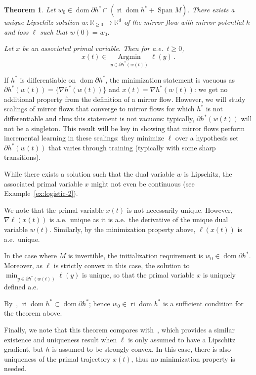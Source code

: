 \documentclass[11pt,english,reqno]{article}
\DeclareMathOperator{\Span}{Span}
\DeclareMathOperator{\dom}{dom}
\DeclareMathOperator{\Argmin}{Argmin}
\DeclareMathOperator{\ri}{ri}
\newcommand{\R}{\mathbb{R}}
\renewcommand{\geq}{\geqslant}
\theoremstyle{plain}
\newtheorem{thm}[proposition]{Theorem}
\theoremstyle{definition}
\theoremstyle{remark}
\numberwithin{equation}{section}
\begin{document}
\begin{thm}
	\label{thm:existence-mirror-flow}
	Let $w_0 \in \dom \partial h^* \cap (\ri \dom h^* + \Span M)$. There exists a unique Lipschitz solution $w : \R_{\geq 0} \to \R^d$ of the mirror flow with mirror potential $h$ and loss $\ell$ such that $w(0) = w_0$. 

Let $x$ be an associated primal variable. Then for a.e.~$t \geq 0$,
	\begin{equation*}
		x(t) \in \underset{y\in\partial h^*(w(t))}{\Argmin} \ell(y) \, .
	\end{equation*}
\end{thm}
If $h^*$ is differentiable on $\dom \partial h^*$, the minimization statement is vacuous as $\partial h^*(w(t)) = \{ \nabla h^*(w(t)) \}$ and $x(t) = \nabla h^*(w(t))$: we get no additional property from the definition of a mirror flow. However, we will study scalings of mirror flows that converge to mirror flows for which $h^*$ is not differentiable and thus this statement is not vacuous: typically, $\partial h^*(w(t))$ will not be a singleton. This result will be key in showing that mirror flows perform incremental learning in these scalings: they minimize $\ell$ over a hypothesis set $\partial h^*(w(t))$ that varies through training (typically with some sharp transitions). 

While there exists a solution such that the dual variable $w$ is Lipschitz, the associated primal variable $x$ might not even be continuous (see Example~\ref{ex:logistic-2}).

We note that the primal variable $x(t)$ is not necessarily unique. However, $\nabla \ell(x(t))$ is a.e.~unique as it is a.e.~the derivative of the unique dual variable $w(t)$. Similarly, by the minimization property above, $\ell(x(t))$ is a.e.~unique.

In the case where $M$ is invertible, the initialization requirement is $w_0 \in \dom \partial h^*$. Moreover, as $\ell$ is strictly convex in this case, the solution to $\min_{y \in \partial h^*(w(t))} \ell(y)$ is unique, so that the primal variable $x$ is uniquely defined a.e.

By~\cite[Corollary 16.18]{bauschke2017convex}, $\ri \dom h^* \subset \dom \partial h^*$; hence $w_0 \in \ri \dom h^*$ is a sufficient condition for the theorem above.

Finally, we note that this theorem compares with~\cite[Theorem 3.1]{attouch2004singular}, which provides a similar existence and uniqueness result when $\ell$ is only assumed to have a Lipschitz gradient, but $h$ is assumed to be strongly convex. In this case, there is also uniqueness of the primal trajectory $x(t)$, thus no minimization property is needed.
\end{document}
